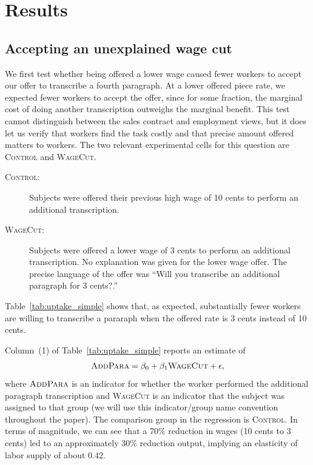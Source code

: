 \documentclass[11pt]{article}
\begin{document}
\section{Results}

\subsection{Accepting an unexplained wage cut}
We first test whether being offered a lower wage caused fewer workers to accept our offer to transcribe a fourth paragraph.
At a lower offered piece rate, we expected fewer workers to accept the offer, since for some fraction, the marginal cost of doing another transcription outweighs the marginal benefit.
This test cannot distinguish between the sales contract and employment views, but it does let us verify that workers find the task costly and that precise amount offered matters to workers. 
The two relevant experimental cells for this question are \textsc{Control} and \textsc{WageCut}. 
\begin{description}
 \item[\textsc{Control}:] Subjects were offered their previous high wage of 10
  cents to perform an additional transcription.
 \item[\textsc{WageCut}:] Subjects were offered a lower wage of 3 cents to perform an additional transcription.
   No explanation was given for the lower wage offer.
   The precise language of the offer was ``Will you transcribe an additional paragraph for 3 cents?.''
\end{description} 
Table~\ref{tab:uptake_simple} shows that, as expected, substantially fewer workers are willing to transcribe a pararaph when the offered rate is 3 cents instead of 10 cents.



Column~(1) of Table~\ref{tab:uptake_simple} reports an estimate of
\begin{align}
  \textsc{AddPara} = \beta_0 + \beta_{1} \textsc{WageCut} + \epsilon, 
\end{align}
where $\textsc{AddPara}$ is an indicator for whether the worker performed the additional paragraph transcription and \textsc{WageCut} is an indicator that the subject was assigned to that group (we will use this indicator/group name convention throughout the paper). 
The comparison group in the regression is \textsc{Control}. 
In terms of magnitude, we can see that a 70\% reduction in wages (10 cents to 3 cents) led to an approximately 30\% reduction output, implying an elasticity of labor supply of about $0.42$.
\end{document}
